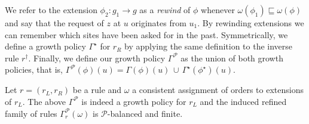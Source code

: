 \documentclass[a4paper,12pt]{article}
\newcommand{\gp}{\Gamma}
\newcommand{\shapes}{\mathcal{P}}
\newcommand{\comatch}[1]{#1^\star}
\newcommand{\inv}[1]{#1^\dagger}
\begin{document}
We refer to the extension $\phi_2: g_1 \to g$
as a \emph{rewind} of $\phi$
whenever $\omega(\phi_1) \sqsubseteq \omega(\phi)$
and say that the request of $z$ at $u$ originates from $u_1$.
By rewinding extensions we can remember
which sites have been asked for in the past.
Symmetrically, we define a growth policy $\comatch{\gp}$ for $r_R$
by applying the same definition to the inverse rule $\inv{r}$.
Finally, we define our growth policy $\gp^\shapes$
as the union of both growth policies,
that is, $\gp^\shapes(\phi)(u) = \gp(\phi)(u)
\,\cup\, \comatch{\gp}(\comatch{\phi})(u)$.

\begin{theorem}
  Let $r = (r_L,r_R)$ be a rule
  and $\omega$ a consistent assignment of orders
  to extensions of $r_L$.
  The above $\gp^\shapes$ is indeed a growth policy for $r_L$
  and the induced refined family of rules $\gp^\shapes_r(\omega)$
  is $\shapes$-balanced and finite.
\end{theorem}
\end{document}
